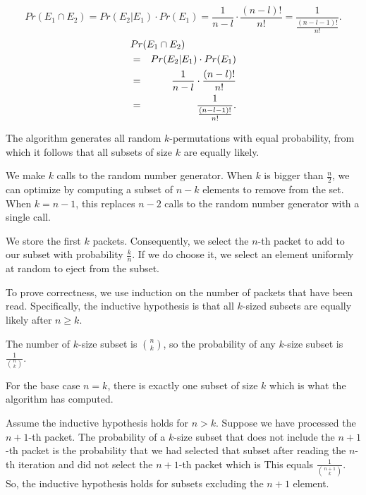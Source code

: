 {
\[
Pr( E_1 \cap E_2)  =   Pr( E_2 | E_1) \cdot Pr( E_1)
                     =  \frac{1}{n-l} \cdot \frac{( n - l)!}{n!}
                        = \frac{1}{\frac {(n-l-1)!}{n!}} .
\]
}
{
\begin{eqnarray*}
\lefteqn{Pr( E_1 \cap E_2)  } \\
 & = & Pr( E_2 | E_1) \cdot Pr( E_1) \\
 & = & \frac{1}{n-l} \cdot \frac{( n - l)!}{n!} \\
 & = & \frac{1}{\frac {(n-l-1)!}{n!}} .
\end{eqnarray*}
}

The algorithm generates all random $k$-permutations with equal probability,
from which it follows that all subsets of size $k$ are equally likely.

We make $k$ calls to the random number generator.  When $k$ is bigger than $\frac{n}{2}$, 
we can optimize by computing a subset of $n-k$ elements to remove from the set.
When $k = n-1$, this replaces $n-2$ calls to the random number generator with a single call.


We store the first $k$ packets. Consequently, we select the $n$-th packet
to add to our subset with probability $\frac{k}{n}$. If we do choose it,
we select an element uniformly at random to eject from the 
subset.

To prove correctness, we use induction on
the number of packets that have been read. Specifically,
the inductive hypothesis is that all $k$-sized subsets are equally likely after
$n \geq k$. 

The number of $k$-size subset is $\binom{n}{k}$,
so the probability of  any $k$-size subset is $\frac{1}{\binom{n}{k}}$.

For the base case $n=k$, there is exactly one subset of size $k$
which is what the algorithm has computed.

Assume the inductive hypothesis holds for $n > k$.  Suppose we have
processed the $n+1$-th packet.  The probability
of a $k$-size subset that does not include the $n+1$-th packet
is the probability that we had selected that subset after reading
the $n$-th iteration and did not select the $n+1$-th packet which is
This equals $\frac{1}{\binom{n+1}{k}}$.
So, the inductive hypothesis holds for subsets excluding the $n+1$ element.

